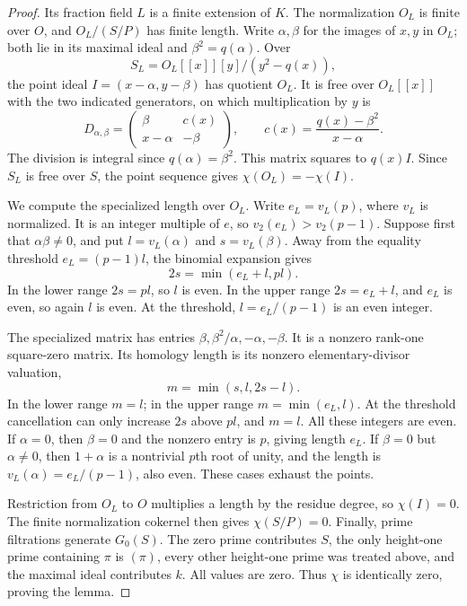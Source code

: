 \begin{proof}
Its fraction field $L$ is a finite extension of $K$.  The normalization
$O_L$ is finite over $O$, and $O_L/(S/P)$ has finite length.
Write $\alpha,\beta$ for the images of $x,y$ in $O_L$; both lie
in its maximal ideal and $\beta^2=q(\alpha)$.
Over
\[
 S_L=O_L[[x]][y]/(y^2-q(x)),
\]
the point ideal $I=(x-\alpha,y-\beta)$ has quotient $O_L$.
It is free over $O_L[[x]]$ with the two indicated generators,
on which multiplication by $y$ is
\[
 D_{\alpha,\beta}=
 \begin{pmatrix}
 \beta&c(x)\\ x-\alpha&-\beta
 \end{pmatrix},\qquad
 c(x)=\frac{q(x)-\beta^2}{x-\alpha}.
\]
The division is integral since $q(\alpha)=\beta^2$.
This matrix squares to $q(x)I$.  Since $S_L$ is free over $S$,
the point sequence gives $\chi(O_L)=-\chi(I)$.

We compute the specialized length over $O_L$.  Write
$e_L=v_L(p)$, where $v_L$ is normalized.  It is an integer multiple
of $e$, so $v_2(e_L)>v_2(p-1)$.  Suppose first that
$\alpha\beta\ne0$, and put $l=v_L(\alpha)$ and $s=v_L(\beta)$.
Away from the equality threshold $e_L=(p-1)l$, the binomial expansion
gives
\[
 2s=\min(e_L+l,pl).
\]
In the lower range $2s=pl$, so $l$ is even.  In the upper range
$2s=e_L+l$, and $e_L$ is even, so again $l$ is even.
At the threshold, $l=e_L/(p-1)$ is an even integer.

The specialized matrix has entries
$\beta,\beta^2/\alpha,-\alpha,-\beta$.
It is a nonzero rank-one square-zero matrix.  Its homology length
is its nonzero elementary-divisor valuation,
\[
 m=\min(s,l,2s-l).
\]
In the lower range $m=l$; in the upper range $m=\min(e_L,l)$.
At the threshold cancellation can only increase $2s$ above $pl$,
and $m=l$.  All these integers are even.
If $\alpha=0$, then $\beta=0$ and the nonzero entry is $p$,
giving length $e_L$.  If $\beta=0$ but $\alpha\ne0$, then
$1+\alpha$ is a nontrivial $p$th root of unity, and the length is
$v_L(\alpha)=e_L/(p-1)$, also even.  These cases exhaust the points.

Restriction from $O_L$ to $O$ multiplies a length by the residue
degree, so $\chi(I)=0$.  The finite normalization cokernel then gives
$\chi(S/P)=0$.  Finally, prime filtrations generate $G_0(S)$.
The zero prime contributes $S$, the only height-one prime containing
$\pi$ is $(\pi)$, every other height-one prime was treated above,
and the maximal ideal contributes $k$.  All values are zero.
Thus $\chi$ is identically zero, proving the lemma.
\end{proof}

